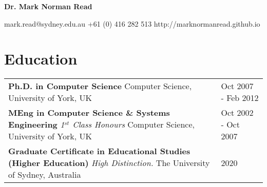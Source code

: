 \documentclass[a4paper]{article}
\begin{document}
\begin{center}
\LARGE{\textbf{Dr. Mark Norman Read}}\vspace{3mm}\\
\end{center}


\begin{center}
mark.read@sydney.edu.au \hspace{1cm} +61 (0) 416 282 513 \hspace{1cm} http://marknormanread.github.io\\
\end{center}

\section*{Education}


\begin{tabular}{p{12cm}p{6cm}}

    \textbf{Ph.D. in Computer Science}\newline
    Computer Science, University of York, UK
    \vspace{3mm}
    &
    Oct 2007 - Feb 2012\\

    \textbf{MEng in Computer Science \& Systems Engineering}\newline
    \textit{1$^{st}$ Class Honours}\newline
    Computer Science, University of York, UK
    \vspace{3mm}
    &
    Oct 2002 - Oct 2007\\

    \textbf{Graduate Certificate in Educational Studies (Higher Education)} \newline
    \textit{High Distinction.}\newline
    The University of Sydney, Australia
    \vspace{3mm}
    &
    2020\\
\end{tabular}
\end{document}
